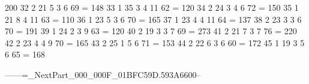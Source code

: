    200
     32         2         21          5          3      6        69      =
   148
     33        1        35          3         4       11         62      =
   120
     34         2         24          3         4      6        72       =
  150
     35        1        21          8         4       11         63      =
   110
     36        1        23          5          3      6        70        =
 165
     37        1        23          4         4       11         64      =
   137
     38         2         23          3          3      6        70      =
   191
     39        1        24          2          3      9        63        =
 120
     40         2         19          3          3     7       69        =
 273
     41         2         21          7          3     7       76        =
 220
     42         2         23          4         4      9        70       =
  165
     43         2         25          1         5      6        71       =
  153
     44         2         22          6          3      6        60      =
   172
     45        1        19          3         5      6        65         =
168



------=_NextPart_000_000F_01BFC59D.593A6600--


